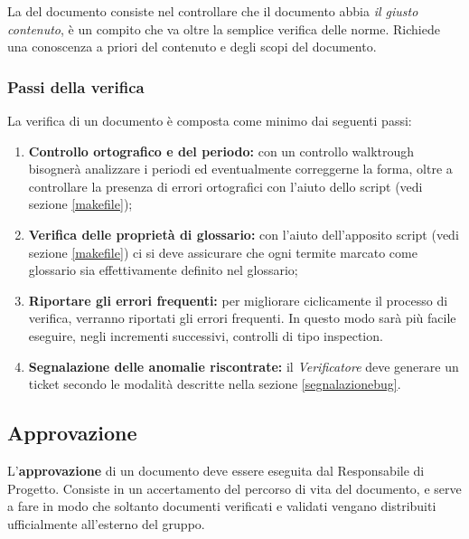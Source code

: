 La \textbf{} del documento consiste nel controllare che il documento abbia \textit{il giusto contenuto}, è un compito che va oltre la semplice verifica delle norme. Richiede una conoscenza a priori del contenuto e degli scopi del documento.
	
	
	\subsubsection{Passi della verifica}
	La verifica di un documento è composta come minimo dai seguenti passi:
	\begin{enumerate}
		\item \textbf{Controllo ortografico e del periodo:} con un controllo walktrough bisognerà analizzare i periodi ed eventualmente correggerne la forma, oltre a controllare la presenza di errori ortografici con l'aiuto dello script  (vedi sezione \ref{makefile});
		\item \textbf{Verifica delle proprietà di glossario:} con l'aiuto dell'apposito script  (vedi sezione \ref{makefile}) ci si deve assicurare che ogni termite marcato come glossario sia effettivamente definito nel glossario; 
		\item \textbf{Riportare gli errori frequenti:} per migliorare ciclicamente il processo di verifica, verranno riportati gli errori frequenti. In questo modo sarà più facile eseguire, negli incrementi successivi, controlli di tipo inspection.
		\item \textbf{Segnalazione delle anomalie riscontrate:} il \emph{Verificatore} deve generare un ticket secondo le modalità descritte nella sezione \ref{segnalazionebug}.
	\end{enumerate}

\subsection{Approvazione}

L'\textbf{approvazione} di un documento deve essere eseguita dal Responsabile di Progetto. Consiste in un accertamento del percorso di vita del documento, e serve a fare in modo che soltanto documenti verificati e validati vengano distribuiti ufficialmente all'esterno del gruppo.